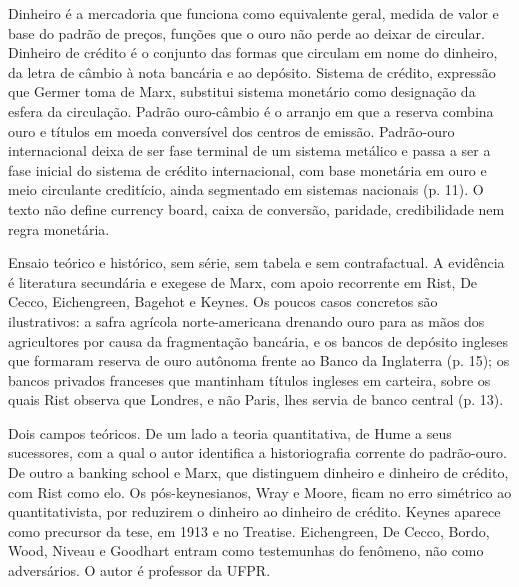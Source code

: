 
Dinheiro é a mercadoria que funciona como equivalente geral, medida de valor e
base do padrão de preços, funções que o ouro não perde ao deixar de circular.
Dinheiro de crédito é o conjunto das formas que circulam em nome do dinheiro, da
letra de câmbio à nota bancária e ao depósito. Sistema de crédito, expressão que
Germer toma de Marx, substitui sistema monetário como designação da esfera da
circulação. Padrão ouro-câmbio é o arranjo em que a reserva combina ouro e
títulos em moeda conversível dos centros de emissão. Padrão-ouro internacional
deixa de ser fase terminal de um sistema metálico e passa a ser a fase inicial do
sistema de crédito internacional, com base monetária em ouro e meio circulante
creditício, ainda segmentado em sistemas nacionais (p. 11). O texto não define
currency board, caixa de conversão, paridade, credibilidade nem regra monetária.

Ensaio teórico e histórico, sem série, sem tabela e sem contrafactual. A
evidência é literatura secundária e exegese de Marx, com apoio recorrente em
Rist, De Cecco, Eichengreen, Bagehot e Keynes. Os poucos casos concretos são
ilustrativos: a safra agrícola norte-americana drenando ouro para as mãos dos
agricultores por causa da fragmentação bancária, e os bancos de depósito ingleses
que formaram reserva de ouro autônoma frente ao Banco da Inglaterra (p. 15); os
bancos privados franceses que mantinham títulos ingleses em carteira, sobre os
quais Rist observa que Londres, e não Paris, lhes servia de banco central
(p. 13).


Dois campos teóricos. De um lado a teoria quantitativa, de Hume a seus
sucessores, com a qual o autor identifica a historiografia corrente do
padrão-ouro. De outro a banking school e Marx, que distinguem dinheiro e dinheiro
de crédito, com Rist como elo. Os pós-keynesianos, Wray e Moore, ficam no erro
simétrico ao quantitativista, por reduzirem o dinheiro ao dinheiro de crédito.
Keynes aparece como precursor da tese, em 1913 e no Treatise. Eichengreen, De
Cecco, Bordo, Wood, Niveau e Goodhart entram como testemunhas do fenômeno, não
como adversários. O autor é professor da UFPR.

